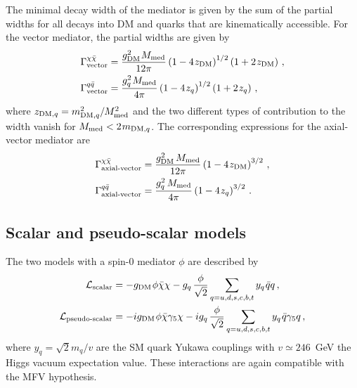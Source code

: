 The minimal decay width of the mediator is given by the sum of the partial widths for all decays into DM and quarks that are kinematically accessible. For the vector mediator, the partial widths are given by
\begin{align}
\Gamma_{\text{vector}}^{\chi\bar{\chi}} & = \frac{g_{\rm{DM}}^2 \hspace{0.25mm} M_{\rm{med}}}{12\pi} 
 \left (1-4 \hspace{0.25mm}  z_{\rm{DM}} \right )^{1/2} \left(1 + 2 \hspace{0.25mm}  z_{\rm{DM}} \right) \, , \\
\Gamma_{\text{vector}}^{q\bar{q}} & = \frac{g_q^2 \hspace{0.25mm}  M_{\rm{med}}}{4\pi} 
 \left ( 1-4 \hspace{0.25mm}  z_q \right )^{1/2}   \left(1 + 2 \hspace{0.25mm}  z_q \right) \, ,
\end{align}
where $z_{{\rm{DM}},q} = m_{\mathrm{DM},q}^2/M_{\rm{med}}^2$ and the two different types of contribution to the width vanish for $M_{\rm{med}} < 2 \hspace{0.25mm}  m_{{\rm{DM}},q}$. The corresponding expressions for the axial-vector mediator are
\begin{align}
\Gamma_{\text{axial-vector}}^{\chi\bar{\chi}} & = \frac{g_{\rm{DM}}^2 \, M_{\rm{med}}}{12\pi} 
\left ( 1-4 \hspace{0.25mm} z_{\rm{DM}} \right ) ^{3/2} \,, \\ 
  \Gamma_{\text{axial-vector}}^{q\bar{q}} & =  \frac{g_q^2 \, M_{\rm{med}}}{4\pi} 
\left ( 1-4 \hspace{0.25mm} z_q \right ) ^{3/2} \, .
\end{align}

\subsection{Scalar and pseudo-scalar  models}
\label{sub:smodels} 
The two models with a spin-0 mediator $\phi$ are described by 
\begin{align}
\mathcal{L}_{\text{scalar}}&=- g_{\rm{DM}}  \hspace{0.25mm}  \phi \bar{\chi}\chi-  g_q  \hspace{0.5mm}  \frac{\phi}{\sqrt{2}}\sum_{q=u,d,s,c,b,t}  y_q \hspace{0.25mm}  \bar{q}q \,, \label{eq:Scalar} \\
\mathcal{L}_{\text{pseudo-scalar}}&=- i g_{\rm{DM}}  \hspace{0.25mm}  \phi \bar{\chi}\gamma_5 \chi - i  g_q \hspace{0.5mm} \frac{\phi}{\sqrt{2}}\sum_{q=u,d,s,c,b,t} y_q \hspace{0.25mm}  \bar{q}\gamma_5 q \label{eq:PseudoScalar}\,,
\end{align}
where $y_q=\sqrt{2} m_q/v$ are the SM quark Yukawa couplings with $v\simeq246$~GeV the Higgs vacuum expectation value. These interactions are again compatible with the MFV hypothesis.


